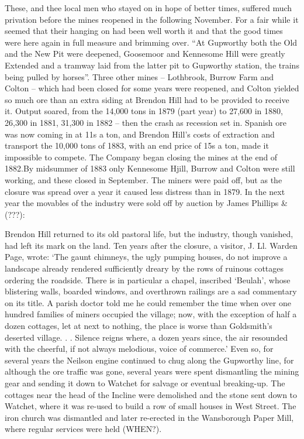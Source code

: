 \documentclass[10pt,a4paper]{article}
\begin{document}
These, and thee local men who stayed on in hope of better times, suffered much privation before the mines reopened in the following November. 
       For a fair while it seemed that their hanging on had been well worth it and that the good times were here again in full measure and brimming over. “At Gupworthy both the Old and the New Pit were deepened, Goosemoor and Kennesome Hill were greatly
Extended and a tramway laid from the latter pit to Gupworthy station, the trains being pulled by horses”. Three other mines – Lothbrook, Burrow Farm and Colton – which had been closed for some years were reopened, and Colton yielded so much ore than an extra siding at Brendon Hill had to be provided to receive it.               
         Output soared, from the 14,000 tons in 1879 (part year) to 27,600 in 1880, 26,300 in 1881, 31,300 in 1882 – then the crash as recession set in. Spanish ore was now coming in at 11s a ton, and Brendon Hill’s costs of extraction and transport the 10,000 tons of 1883, with an end price of 15s a ton, made it impossible to compete. The Company began closing the mines at the end of 1882.By midsummer of 1883 only Kennesome Hjill, Burrow and Colton were still working, and these closed in September. The miners were paid off, but as the closure was spread over a year it caused less distress than in 1879.
     In the next year the movables of the industry were sold off by auction by James Phillips \& (???): 

    Brendon Hill returned to its old pastoral life, but the industry, though vanished, had left its mark on the land. Ten years after the closure, a visitor, J. Ll. Warden Page, wrote: ‘The gaunt chimneys, the ugly pumping houses, do not improve a landscape already rendered sufficiently dreary by the rows of ruinous cottages ordering the roadside. There is in particular a chapel, inscribed ‘Beulah’, whose blistering walls, boarded windows, and overthrown railings are a sad commentary on its title.  A parish doctor told me he could remember the time when over one hundred families of miners occupied the village; now, with the exception of half a dozen cottages, let at next to nothing, the place is worse than Goldsmith’s deserted village. . . Silence reigns where, a dozen years since, the air resounded with the cheerful, if not always melodious, voice of commerce.’   
   Even so, for several years the Neilson engine continued to chug along the Gupworthy line, for although the ore traffic was gone, several years were spent dismantling the mining gear and sending it down to Watchet for salvage or eventual breaking-up. The cottages near the head of the Incline were demolished and the stone sent down to Watchet, where it was re-used to build a row of small houses in West Street. The iron church was dismantled and later re-erected in the Wansborough Paper Mill, where regular services were held (WHEN?). 
\end{document}

